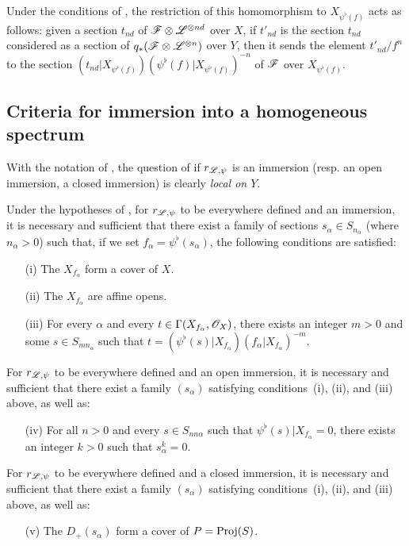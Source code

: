 \begin{remarks}[3.7.9]
\begin{enumerate}
    Under the conditions of , the restriction of this homomorphism to $X_{\psi^\flat(f)}$ acts as follows:
    given a section $t_{nd}$ of $\mathscr{F}\otimes\mathscr{L}^{\otimes nd}$ over $X$, if $t'_{nd}$ is the section $t_{nd}$ considered as a section of $q_*(\mathscr{F}\otimes\mathscr{L}^{\otimes n})$ over $Y$, then it sends the element $t'_{nd}/f^n$ to the section $(t_{nd}|X_{\psi^\flat(f)})(\psi^\flat(f)|X_{\psi^\flat(f)})^{-n}$ of $\mathscr{F}$ over $X_{\psi^\flat(f)}$.
\end{enumerate}
\end{remarks}


\subsection{Criteria for immersion into a homogeneous spectrum}
\label{subsection:II.3.8}

\begin{env}[3.8.1]
\label{II.3.8.1}
With the notation of , the question of if $r_{\mathscr{L},\psi}$ is an immersion (resp. an open immersion, a closed immersion) is clearly \emph{local on $Y$}.
\end{env}

\begin{proposition}[3.8.2]
\label{II.3.8.2}
Under the hypotheses of , for $r_{\mathscr{L},\psi}$ to be everywhere defined and an immersion, it is necessary and sufficient that there exist a family of sections $s_\alpha\in S_{n_\alpha}$ (where $n_\alpha>0$) such that, if we set $f_\alpha=\psi^\flat(s_\alpha)$, the following conditions are satisfied:
\begin{enumerate}
  \item[(i)] The $X_{f_\alpha}$ form a cover of $X$.
  \item[(ii)] The $X_{f_\alpha}$ are affine opens.
  \item[(iii)] For every $\alpha$ and every $t\in\Gamma(X_{f_\alpha},\mathscr{O}_X)$, there exists an integer $m>0$ and some $s\in S_{mn_\alpha}$ such that $t=(\psi^\flat(s)|X_{f_\alpha})(f_\alpha|X_{f_\alpha})^{-m}$.
\end{enumerate}

For $r_{\mathscr{L},\psi}$ to be everywhere defined and an open immersion, it is necessary and sufficient that there exist a family $(s_\alpha)$ satisfying conditions~(i), (ii), and (iii) above, as well as:
\begin{enumerate}
  \item[(iv)] For all $n>0$ and every $s\in S_{nn\alpha}$ such that $\psi^\flat(s)|X_{f_\alpha}=0$, there exists an integer $k>0$ such that $s_\alpha^k=0$.
\end{enumerate}

For $r_{\mathscr{L},\psi}$ to be everywhere defined and a closed immersion, it is necessary and sufficient that there exist a family $(s_\alpha)$ satisfying conditions~(i), (ii), and (iii) above, as well as:
\begin{enumerate}
  \item[(v)] The $D_+(s_\alpha)$ form a cover of $P=\operatorname{Proj}(S)$.
\end{enumerate}
\end{proposition}

